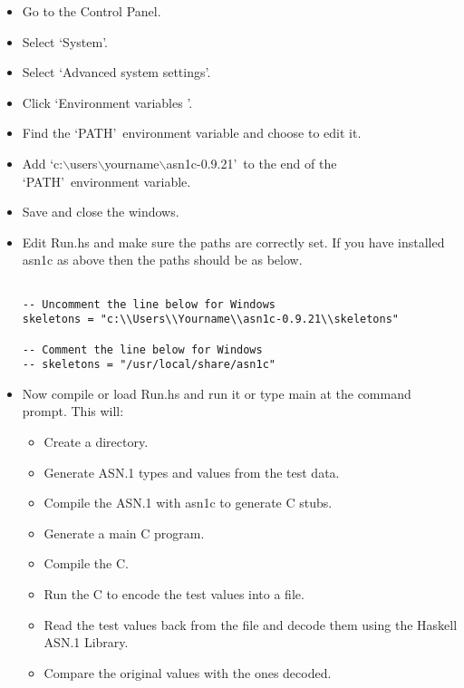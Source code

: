 \documentclass{article}
\begin{document}
\begin{itemize}
\item
Go to the Control Panel.
\item
Select \lq System\rq .
\item
Select \lq Advanced system settings\rq .
\item
Click \lq Environment variables \rq .
\item
Find the \lq PATH\rq\ environment variable and choose to edit it.
\item
Add \lq c:$\backslash$users$\backslash$yourname$\backslash$asn1c-0.9.21\rq\
to the end of the \lq PATH\rq\ environment variable.
\item
Save and close the windows.
\item
Edit Run.hs and make sure the paths are correctly set. If you have
installed asn1c as above then the paths should be as below.

\lstset{language=Haskell}

\begin{lstlisting}[frame=single]

-- Uncomment the line below for Windows
skeletons = "c:\\Users\\Yourname\\asn1c-0.9.21\\skeletons"

-- Comment the line below for Windows
-- skeletons = "/usr/local/share/asn1c"

\end{lstlisting}
\item
Now compile or load Run.hs and run it or type main at the command prompt.
This will:

\begin{itemize}
\item
Create a directory.
\item
Generate ASN.1 types and values from the test data.
\item
Compile the ASN.1 with asn1c to generate C stubs.
\item
Generate a main C program.
\item
Compile the C.
\item
Run the C to encode the test values into a file.
\item
Read the test values back from the file and decode them using the Haskell
ASN.1 Library.
\item
Compare the original values with the ones decoded.
\end{itemize}

\end{itemize}
\end{document}
